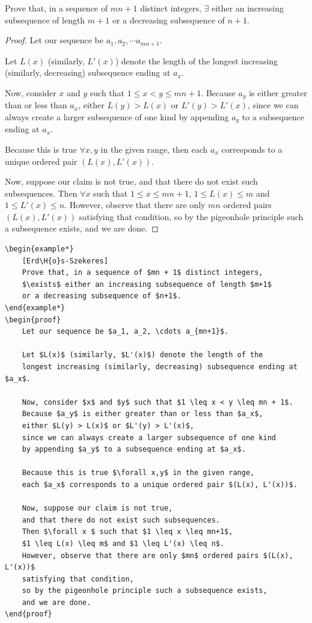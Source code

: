 \documentclass[a4paper]{scrartcl}
\begin{document}
\begin{example*}
	Prove that, in a sequence of $mn + 1$ distinct integers, $\exists$ either an increasing subsequence of length $m+1$ or a decreasing subsequence of $n+1$.
\end{example*}
\begin{proof}
	Let our sequence be $a_1, a_2, \cdots a_{mn+1}$.

	Let $L(x)$ (similarly, $L'(x)$) denote the length of the longest increasing (similarly, decreasing) subsequence ending at $a_x$.

	Now, consider $x$ and $y$ such that $1 \leq x < y \leq mn + 1$. Because $a_y$ is either greater than or less than $a_x$, either $L(y) > L(x)$ or $L'(y) > L'(x)$, since we can always create a larger subsequence of one kind by appending $a_y$ to a subsequence ending at $a_x$.

	Because this is true $\forall x,y$ in the given range, then each $a_x$ corresponds to a unique ordered pair $(L(x), L'(x))$.

	Now, suppose our claim is not true, and that there do not exist such subsequences. Then $\forall x $ such that $1 \leq x \leq mn+1$, $1 \leq L(x) \leq m$ and $1 \leq L'(x) \leq n$. However, observe that there are only $mn$ ordered pairs $(L(x), L'(x))$ satisfying that condition, so by the pigeonhole principle such a subsequence exists, and we are done.

\end{proof}
\begin{verbatim}
\begin{example*}
	[Erd\H{o}s-Szekeres]
	Prove that, in a sequence of $mn + 1$ distinct integers, 
	$\exists$ either an increasing subsequence of length $m+1$ 
	or a decreasing subsequence of $n+1$.
\end{example*}
\begin{proof}
	Let our sequence be $a_1, a_2, \cdots a_{mn+1}$.

	Let $L(x)$ (similarly, $L'(x)$) denote the length of the 
	longest increasing (similarly, decreasing) subsequence ending at $a_x$.

	Now, consider $x$ and $y$ such that $1 \leq x < y \leq mn + 1$. 
	Because $a_y$ is either greater than or less than $a_x$, 
	either $L(y) > L(x)$ or $L'(y) > L'(x)$, 
	since we can always create a larger subsequence of one kind 
	by appending $a_y$ to a subsequence ending at $a_x$.

	Because this is true $\forall x,y$ in the given range, 
	each $a_x$ corresponds to a unique ordered pair $(L(x), L'(x))$.

	Now, suppose our claim is not true, 
	and that there do not exist such subsequences. 
	Then $\forall x $ such that $1 \leq x \leq mn+1$,
	$1 \leq L(x) \leq m$ and $1 \leq L'(x) \leq n$. 
	However, observe that there are only $mn$ ordered pairs $(L(x), L'(x))$ 
	satisfying that condition, 
	so by the pigeonhole principle such a subsequence exists, 
	and we are done.
\end{proof}
\end{verbatim}
\end{document}
